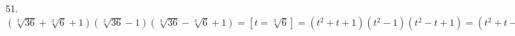 51. $(\sqrt[3]{36}+\sqrt[3]{6}+1)(\sqrt[3]{36}-1)(\sqrt[3]{36}-\sqrt[3]{6}+1)=[t=\sqrt[3]{6}]=(t^2+t+1)(t^2-1)(t^2-t+1)=
(t^2+t-1)(t-1)(t+1)(t^2-t+1)=(t^3+1)(t^3-1)=t^6-1=(\sqrt[3]{6})^6-1=36-1=35.$\\
